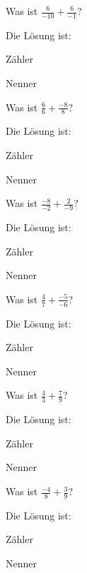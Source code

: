 \documentclass{ximera}
\begin{document}
\begin{shuffle}
\begin{question}
Was ist $\frac{6}{-10} + \frac{6}{-1}$?
\begin{solution}
Die Lösung ist:

Zähler 

Nenner 
\end{solution}
\end{question}


\begin{question}
Was ist $\frac{6}{6} + \frac{-8}{8}$?
\begin{solution}
Die Lösung ist:

Zähler 

Nenner 
\end{solution}
\end{question}


\begin{question}
Was ist $\frac{-8}{-2} + \frac{2}{-9}$?
\begin{solution}
Die Lösung ist:

Zähler 

Nenner 
\end{solution}
\end{question}


\begin{question}
Was ist $\frac{4}{7} + \frac{-5}{-6}$?
\begin{solution}
Die Lösung ist:

Zähler 

Nenner 
\end{solution}
\end{question}


\begin{question}
Was ist $\frac{4}{3} + \frac{7}{9}$?
\begin{solution}
Die Lösung ist:

Zähler 

Nenner 
\end{solution}
\end{question}


\begin{question}
Was ist $\frac{-4}{8} + \frac{3}{9}$?
\begin{solution}
Die Lösung ist:

Zähler 

Nenner 
\end{solution}
\end{question}



\end{shuffle}
\end{document}
